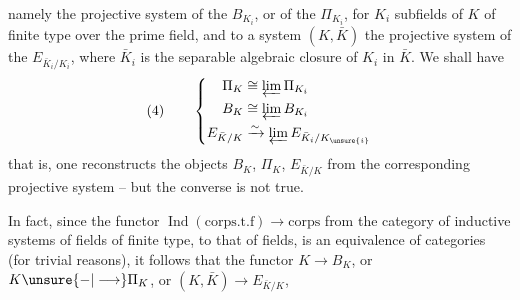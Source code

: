 namely the projective system of the $B_{K_i}$, or of the $\Pi_{K_i}$, for $K_i$ subfields of $K$ of finite type over the prime field, and to a system $(K,\bar K)$ the projective system of the $E_{\bar K_i/K_i}$, where $\bar K_i$ is the separable algebraic closure of $K_i$ in $\bar K$. We shall have
\[
(4)\qquad\left\{\begin{aligned}
\Pi_K&\cong\varprojlim\Pi_{K_i}\\
B_K&\cong\varprojlim B_{K_i}\\
E_{\bar K/K}&\xrightarrow{\sim}\varprojlim E_{\bar K_i/K_{\unsure{i}}}
\end{aligned}\right.
\]
that is, one reconstructs the objects $B_K$, $\Pi_K$, $E_{\bar K/K}$ from the corresponding projective system -- but the converse is not true.

In fact, since the functor $\operatorname{Ind}(\text{corps.t.f})\longrightarrow\text{corps}$ from the category of inductive systems of fields of finite type, to that of fields, is an equivalence of categories (for trivial reasons), it follows that the functor $K\longrightarrow B_K$, or $K\unsure{-|\longrightarrow}\Pi_K$, or $(K,\bar K)\longrightarrow E_{\bar K/K}$, 
